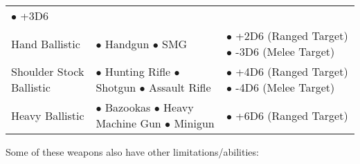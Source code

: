 \begin{center}
\begin{xltabular}{\textwidth}{|l X X|}
                $\bullet$ +3D6 \vspace{1em} \\
        Hand Ballistic & 
            $\bullet$ Handgun \newline
            $\bullet$ SMG \vspace{1em} &
                $\bullet$ +2D6 (Ranged Target) \newline
                $\bullet$ -3D6 (Melee Target) \vspace{1em} \\
        Shoulder Stock Ballistic & 
            $\bullet$ Hunting Rifle \newline
            $\bullet$ Shotgun \newline
            $\bullet$ Assault Rifle \vspace{1em} &
                $\bullet$ +4D6 (Ranged Target) \newline
                $\bullet$ -4D6 (Melee Target) \vspace{1em} \\
        Heavy Ballistic & 
            $\bullet$ Bazookas \newline
            $\bullet$ Heavy Machine Gun \newline
            $\bullet$ Minigun \vspace{1em} &
                $\bullet$ +6D6 (Ranged Target) \vspace{1em} \\
        \hline
    \end{xltabular}
\end{center}

Some of these weapons also have other limitations/abilities:

